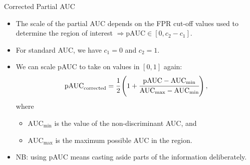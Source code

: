 \begin{vbframe}{Corrected Partial AUC}

\begin{itemize}
  \item The scale of the partial AUC depends on the FPR cut-off values used to
  determine the region of interest $\Rightarrow \text{pAUC} \in [0, c_2 - c_1]$.
  \item For standard AUC, we have $c_1 = 0$ and $c_2 = 1$.
  \item We can scale pAUC to take on values in $[0, 1]$ again:
  $$\text{pAUC}_\text{corrected} = \cfrac{1}{2} \left( 1 + \cfrac{\text{pAUC} -
  \text{AUC}_{\text{min}}}{\text{AUC}_{\text{max}} - \text{AUC}_{\text{min}}}
  \right),$$
  where
  \begin{itemize}
    \item $\text{AUC}_{\text{min}}$ is the value of the non-discriminant AUC,
    and
    \item $\text{AUC}_{\text{max}}$ is the maximum possible AUC in the region.
  \end{itemize}
  \lz
  \item NB: using pAUC means casting aside parts of the information
  deliberately.
\end{itemize}

\end{vbframe}


